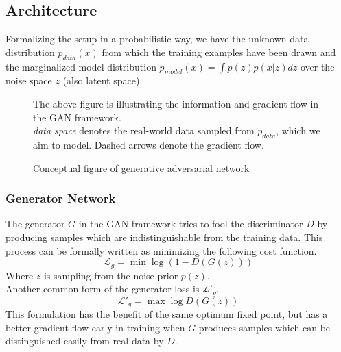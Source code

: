\subsection{Architecture}
\label{sub:gan_arch}
Formalizing the setup in a probabilistic way, we have the unknown data distribution $p_{data}(x)$ from which the training examples have been drawn and the marginalized model distribution $p_{model}(x) = \int p(z)p(x|z) \textit{d}z$ over the noise space $z$ (also latent space).



\begin{figure}[htb]
\centering

  \caption{Conceptual figure of generative adversarial network}
  \label{fig:gan_a}
  \medskip
  \small
  The above figure is illustrating the information and gradient flow in the GAN framework.\\
  \emph{data space} denotes the real-world data sampled from $p_{data}$, which we aim to model.
  Dashed arrows denote the gradient flow.
\end{figure}

%


\subsubsection{Generator Network}
The generator $G$ in the GAN framework tries to fool the discriminator $D$ by producing samples which are indistinguishable from the training data.
This process can be formally written as minimizing the following cost function.
$$
\mathcal{L}_g = \min \log(1 - D(G(z)))
$$
Where $z$ is sampling from the noise prior $p(z)$.\\

Another common form of the generator loss is $\mathcal{L'}_g$.
$$
\mathcal{L'}_g = \max \log D(G(z))
$$
This formulation has the benefit of the same optimum fixed point, but has a better gradient flow early in training when $G$ produces samples which can be distinguished easily from real data by $D$.

